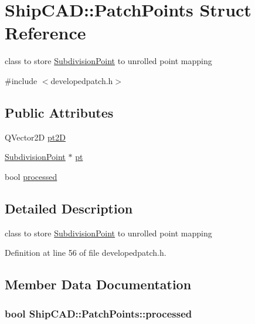 \hypertarget{structShipCAD_1_1PatchPoints}{}\section{Ship\+C\+AD\+:\+:Patch\+Points Struct Reference}
\label{structShipCAD_1_1PatchPoints}


class to store \hyperlink{classShipCAD_1_1SubdivisionPoint}{Subdivision\+Point} to unrolled point mapping  




{\ttfamily \#include $<$developedpatch.\+h$>$}

\subsection*{Public Attributes}
\begin{DoxyCompactItemize}
\item 
Q\+Vector2D \hyperlink{structShipCAD_1_1PatchPoints_abce4e4187927ae79ecd5aafd604c1785}{pt2D}
\item 
\hyperlink{classShipCAD_1_1SubdivisionPoint}{Subdivision\+Point} $\ast$ \hyperlink{structShipCAD_1_1PatchPoints_ac69ca0b5e51939979f4654afa3b210a9}{pt}
\item 
bool \hyperlink{structShipCAD_1_1PatchPoints_a2f52ed0dc9945823b211f9e067164dce}{processed}
\end{DoxyCompactItemize}


\subsection{Detailed Description}
class to store \hyperlink{classShipCAD_1_1SubdivisionPoint}{Subdivision\+Point} to unrolled point mapping 

Definition at line 56 of file developedpatch.\+h.



\subsection{Member Data Documentation}
\subsubsection[{\texorpdfstring{processed}{processed}}]{\setlength{\rightskip}{0pt plus 5cm}bool Ship\+C\+A\+D\+::\+Patch\+Points\+::processed}\hypertarget{structShipCAD_1_1PatchPoints_a2f52ed0dc9945823b211f9e067164dce}{}\label{structShipCAD_1_1PatchPoints_a2f52ed0dc9945823b211f9e067164dce}


